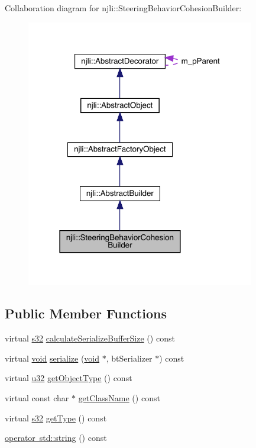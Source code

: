 Collaboration diagram for njli\+:\+:Steering\+Behavior\+Cohesion\+Builder\+:\nopagebreak
\begin{figure}[H]
\begin{center}
\leavevmode
\includegraphics[width=283pt]{classnjli_1_1_steering_behavior_cohesion_builder__coll__graph}
\end{center}
\end{figure}
\subsection*{Public Member Functions}
\begin{DoxyCompactItemize}
\item 
virtual \mbox{\hyperlink{_util_8h_aa62c75d314a0d1f37f79c4b73b2292e2}{s32}} \mbox{\hyperlink{classnjli_1_1_steering_behavior_cohesion_builder_ac9e90802685baa1d00dc45f5923e06e8}{calculate\+Serialize\+Buffer\+Size}} () const
\item 
virtual \mbox{\hyperlink{_thread_8h_af1e856da2e658414cb2456cb6f7ebc66}{void}} \mbox{\hyperlink{classnjli_1_1_steering_behavior_cohesion_builder_aa2682c7df3d8e451aeed4d52199ee540}{serialize}} (\mbox{\hyperlink{_thread_8h_af1e856da2e658414cb2456cb6f7ebc66}{void}} $\ast$, bt\+Serializer $\ast$) const
\item 
virtual \mbox{\hyperlink{_util_8h_a10e94b422ef0c20dcdec20d31a1f5049}{u32}} \mbox{\hyperlink{classnjli_1_1_steering_behavior_cohesion_builder_ae6bfb53672094a0161260e92b7fcd966}{get\+Object\+Type}} () const
\item 
virtual const char $\ast$ \mbox{\hyperlink{classnjli_1_1_steering_behavior_cohesion_builder_a3e53592fa685890b96123f68ee15fc3e}{get\+Class\+Name}} () const
\item 
virtual \mbox{\hyperlink{_util_8h_aa62c75d314a0d1f37f79c4b73b2292e2}{s32}} \mbox{\hyperlink{classnjli_1_1_steering_behavior_cohesion_builder_ab6822284ca24cdb64af18303ad52e197}{get\+Type}} () const
\item 
\mbox{\hyperlink{classnjli_1_1_steering_behavior_cohesion_builder_a02280a22f87a0463f386ae455b7ccfd8}{operator std\+::string}} () const
\end{DoxyCompactItemize}
